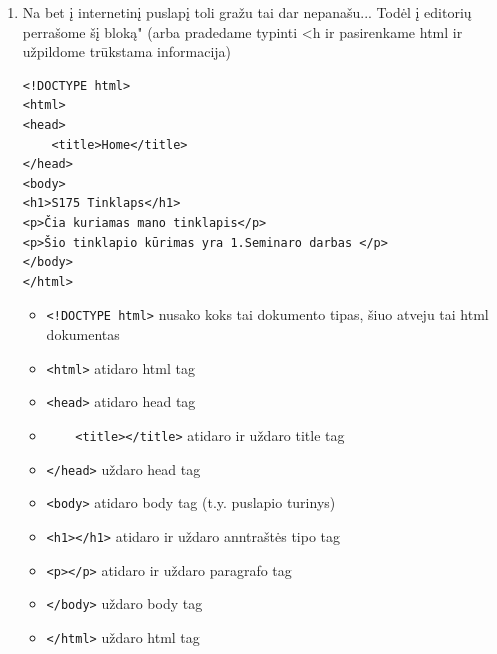 \documentclass[11pt,a4paper]{article}
\begin{document}
\begin{enumerate}
\item Na bet į internetinį puslapį toli gražu tai dar nepanašu... Todėl į editorių perrašome šį bloką" (arba pradedame typinti <h ir pasirenkame html ir užpildome trūkstama informacija)

\begin{lstlisting}
<!DOCTYPE html>
<html>
<head>
	<title>Home</title>
</head>
<body>
<h1>S175 Tinklaps</h1>
<p>Čia kuriamas mano tinklapis</p>
<p>Šio tinklapio kūrimas yra 1.Seminaro darbas </p>
</body>
</html>
\end{lstlisting}

\begin{itemize}
\item \colorbox{listinggray}{\lstinline|<!DOCTYPE html>|} nusako koks tai dokumento tipas, šiuo atveju tai html dokumentas
\item \colorbox{listinggray}{\lstinline|<html>|} atidaro html tag
\item \colorbox{listinggray}{\lstinline|<head>|} atidaro head tag
\item \colorbox{listinggray}{\lstinline|	<title></title>|} atidaro ir uždaro title tag
\item \colorbox{listinggray}{\lstinline|</head>|} uždaro head  tag
\item \colorbox{listinggray}{\lstinline|<body>|} atidaro body tag (t.y. puslapio turinys)
\item \colorbox{listinggray}{\lstinline|<h1></h1>|} atidaro ir uždaro anntraštės tipo tag
\item \colorbox{listinggray}{\lstinline|<p></p>|} atidaro ir uždaro paragrafo tag
\item \colorbox{listinggray}{\lstinline|</body>|} uždaro body tag
\item \colorbox{listinggray}{\lstinline|</html>|} uždaro html tag
\end{itemize}



\end{enumerate}
\end{document}

